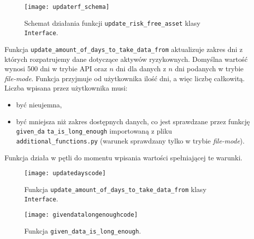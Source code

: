\documentclass[magister]{dyplom}
\def\code#1{\texttt{#1}}
\begin{document}
\begin{figure}[ht]
	\centering
	\texttt{[image: updaterf\_schema]}
	\caption{Schemat działania funkcji \code{update\_risk\_free\_asset} klasy \code{Interface}.}
\end{figure}
\newpage
Funkcja \code{update\_amount\_of\_days\_to\_take\_data\_from} aktualizuje zakres dni z których rozpatrujemy dane dotyczące aktywów ryzykownych. Domyślna wartość wynosi 500 dni w trybie API oraz $n$ dni dla danych z $n$ dni podanych w trybie \textit{file-mode}. Funkcja przyjmuje od użytkownika ilość dni, a więc liczbę całkowitą. Liczba wpisana przez użytkownika musi:
\begin{itemize}
	\item być nieujemna,
	\item być mniejsza niż zakres dostępnych danych, co jest sprawdzane przez funkcję \code{given\_da} \code{ta\_is\_long\_enough} importowaną z pliku \code{additional\_functions.py} (warunek sprawdzany tylko w trybie \textit{file-mode}).
\end{itemize}
Funkcja działa w pętli do momentu wpisania wartości spełniającej te warunki.

\begin{figure}[ht]
	\centering
	\texttt{[image: updatedayscode]}
	\caption{Funkcja \code{update\_amount\_of\_days\_to\_take\_data\_from} klasy \code{Interface}.}
\end{figure}

\begin{figure}[ht!]
	\centering
	\texttt{[image: givendatalongenoughcode]}
	\caption{Funkcja \code{given\_data\_is\_long\_enough}.}
\end{figure}
\end{document}
